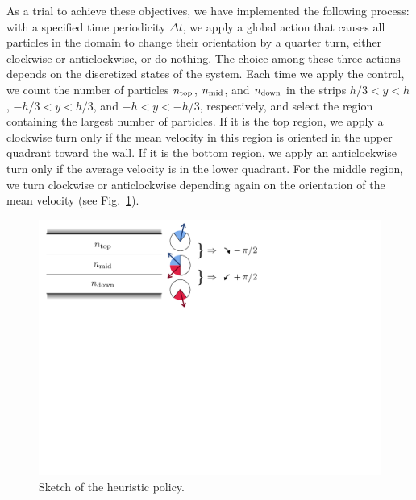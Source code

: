 \documentclass[aps,prl,twocolumn,amsmath,amssymb,superscriptaddress]{revtex4-1}
\begin{document}
As a trial to achieve these objectives, we have implemented the following process: with a specified time periodicity $\Delta t$, we apply a global action that causes all particles in the domain to change their orientation by a quarter turn, either clockwise or anticlockwise, or do nothing. The choice among these three actions depends on the discretized states of the system. Each time we apply the control, we count the number of particles $n_{\rm top}$, $n_{\rm mid}$, and $n_{\rm down}$ in the strips $h/3 < y < h$, $-h/3 < y < h/3$, and $-h < y < -h/3$, respectively, and select the region containing the largest number of particles. If it is the top region, we apply a clockwise turn only if the mean velocity in this region is oriented in the upper quadrant toward the wall. If it is the bottom region, we apply an anticlockwise turn only if the average velocity is in the lower quadrant. For the middle region, we turn clockwise or anticlockwise depending again on the orientation of the mean velocity (see Fig.~\ref{fig:sketch_heuristics}).
\begin{figure}[t!]
    \includegraphics[width=0.8\linewidth]{sketch_heuristics}
    \caption{\label{fig:sketch_heuristics} Sketch of the heuristic policy.}
\end{figure}
\end{document}
